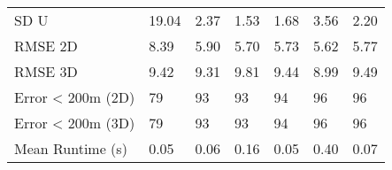 \begin{longtable}{lllllll}
SD U              &      19.04 &       2.37 &      1.53 &     1.68 &     3.56 &        2.20 \\
RMSE 2D           &       8.39 &       5.90 &      5.70 &     5.73 &     5.62 &        5.77 \\
RMSE 3D           &       9.42 &       9.31 &      9.81 &     9.44 &     8.99 &        9.49 \\
Error < 200m (2D) &         79 &         93 &        93 &       94 &       96 &          96 \\
Error < 200m (3D) &         79 &         93 &        93 &       94 &       96 &          96 \\
Mean Runtime (s)  &       0.05 &       0.06 &      0.16 &     0.05 &     0.40 &        0.07 \\
\end{longtable}
